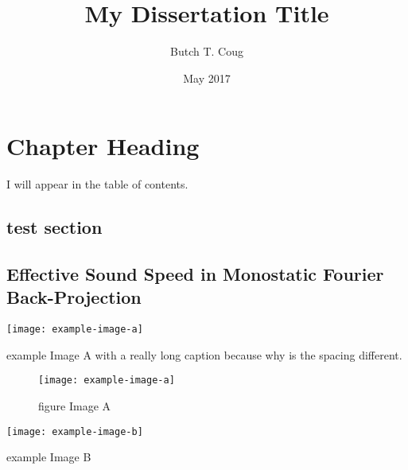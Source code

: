 \documentclass[
DToption=dissertation,%
wsudraft,
]{wsu}
\title{My Dissertation Title}
\author{Butch T. Coug}
\date{May 2017}
\begin{document}
\makeTitlePages

\makeSignaturePage

\begin{ackPage}
\lipsum[3]
\end{ackPage}

\begin{abstractPage}
\lipsum[4-5]
\end{abstractPage}



\tableofcontents\clearpage
\listoftables\clearpage
\listoffigures\clearpage
{}\clearpage

\begin{dedicationPage}
	\lipsum[2]
\end{dedicationPage}


\chapter[Optional Chapter TOC Entry]{Chapter Heading}
I will appear in the table of contents.

\lipsum[1]

\section{test section}
\section{Effective Sound Speed in Monostatic Fourier Back-Projection}

\begin{example}
	\texttt{[image: example-image-a]}
	\caption{example Image A with a really long caption because why is the spacing different.}
\end{example}

\begin{figure}
	\texttt{[image: example-image-a]}
	\caption{figure Image A}
\end{figure}

\begin{example}
	\texttt{[image: example-image-b]}
	\caption{example Image B}
\end{example}

\end{document}
